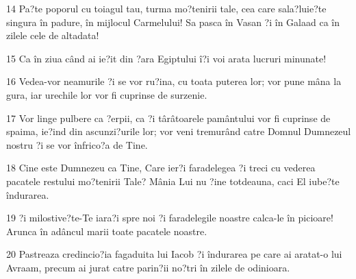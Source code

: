 \par 14 Pa?te poporul cu toiagul tau, turma mo?tenirii tale, cea care sala?luie?te singura în padure, în mijlocul Carmelului! Sa pasca în Vasan ?i în Galaad ca în zilele cele de altadata!
\par 15 Ca în ziua când ai ie?it din ?ara Egiptului î?i voi arata lucruri minunate!
\par 16 Vedea-vor neamurile ?i se vor ru?ina, cu toata puterea lor; vor pune mâna la gura, iar urechile lor vor fi cuprinse de surzenie.
\par 17 Vor linge pulbere ca ?erpii, ca ?i târâtoarele pamântului vor fi cuprinse de spaima, ie?ind din ascunzi?urile lor; vor veni tremurând catre Domnul Dumnezeul nostru ?i se vor înfrico?a de Tine.
\par 18 Cine este Dumnezeu ca Tine, Care ier?i faradelegea ?i treci cu vederea pacatele restului mo?tenirii Tale? Mânia Lui nu ?ine totdeauna, caci El iube?te îndurarea.
\par 19 ?i milostive?te-Te iara?i spre noi ?i faradelegile noastre calca-le în picioare! Arunca în adâncul marii toate pacatele noastre.
\par 20 Pastreaza credincio?ia fagaduita lui Iacob ?i îndurarea pe care ai aratat-o lui Avraam, precum ai jurat catre parin?ii no?tri în zilele de odinioara.


